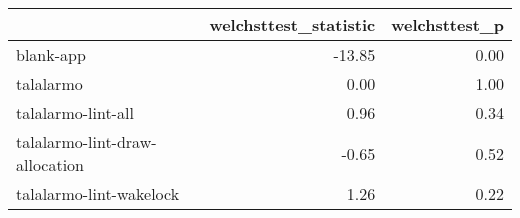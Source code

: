 \begin{tabular}{lrr}
\toprule
{} &  welchsttest\_statistic &  welchsttest\_p \\
\midrule
blank-app                      &                 -13.85 &           0.00 \\
talalarmo                      &                   0.00 &           1.00 \\
talalarmo-lint-all             &                   0.96 &           0.34 \\
talalarmo-lint-draw-allocation &                  -0.65 &           0.52 \\
talalarmo-lint-wakelock        &                   1.26 &           0.22 \\
\bottomrule
\end{tabular}

